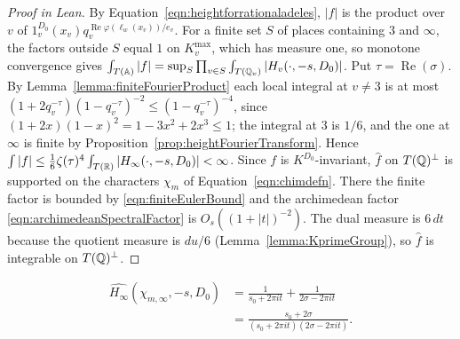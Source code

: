 \begin{proof}[Proof in Lean]

\leanok


By Equation~\ref{eqn:heightforrationaladeles}, $|f|$ is the product over $v$ of $1_v^{D_0}(x_v)q_v^{\operatorname{Re}\varphi(\ell_w(x_v))/e_v}$. For a finite set $S$ of places containing $3$ and $\infty$, the factors outside $S$ equal $1$ on $K_v^{\mathrm{max}}$, which has measure one, so monotone convergence gives $\int_{T(\mathbb{A})}|f|=\sup_S\prod_{v\in S}\int_{T(\mathbb{Q}_v)}|H_v(\cdot,-s,D_0)|$. Put $\tau=\operatorname{Re}(\sigma)$. By Lemma~\ref{lemma:finiteFourierProduct} each local integral at $v\neq3$ is at most $(1+2q_v^{-\tau})(1-q_v^{-\tau})^{-2}\leq(1-q_v^{-\tau})^{-4}$, since $(1+2x)(1-x)^2=1-3x^2+2x^3\leq1$; the integral at $3$ is $1/6$, and the one at $\infty$ is finite by Proposition~\ref{prop:heightFourierTransform}. Hence $\int|f|\leq\tfrac16\zeta(\tau)^4\int_{T(\mathbb{R})}|H_\infty(\cdot,-s,D_0)|<\infty$. Since $f$ is $K^{D_0}$-invariant, $\widehat f$ on $T(\mathbb{Q})^\perp$ is supported on the characters $\chi_m$ of Equation~\ref{eqn:chimdefn}. There the finite factor is bounded by \eqref{eqn:finiteEulerBound} and the archimedean factor \eqref{eqn:archimedeanSpectralFactor} is $O_s((1+|t|)^{-2})$. The dual measure is $6\,dt$ because the quotient measure is $du/6$ (Lemma~\ref{lemma:KprimeGroup}), so $\widehat f$ is integrable on $T(\mathbb{Q})^\perp$.

\end{proof}

\begin{equationnode}

\label{eqn:archimedeanSpectralFactor}


\leanok



\begin{equation*} \begin{aligned} \widehat{H_\infty}(\chi_{m,\infty},-s,D_0) &=\frac1{s_0+2\pi it}+\frac1{2\sigma-2\pi it}\\ &=\frac{s_0+2\sigma} {(s_0+2\pi it)(2\sigma-2\pi it)}. \end{aligned} \end{equation*}

\end{equationnode}

